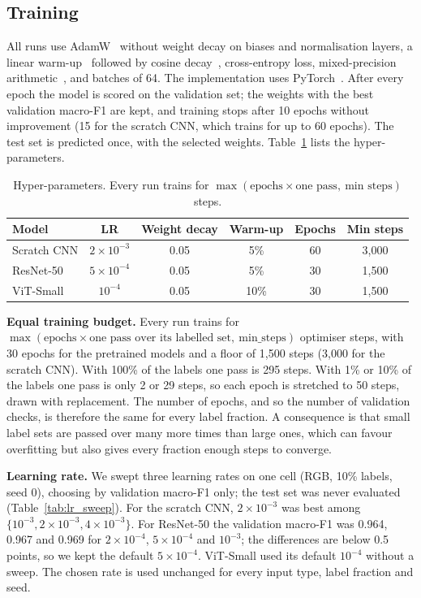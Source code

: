 \documentclass[conference]{IEEEtran}
\begin{document}
\subsection{Training}
All runs use AdamW~\cite{loshchilov2019adamw} without weight decay on biases and normalisation layers, a linear warm-up~\cite{goyal2017warmup} followed by cosine decay~\cite{loshchilov2017sgdr}, cross-entropy loss, mixed-precision arithmetic~\cite{micikevicius2018mixed}, and batches of 64. The implementation uses PyTorch~\cite{paszke2019pytorch}. After every epoch the model is scored on the validation set; the weights with the best validation macro-F1 are kept, and training stops after 10 epochs without improvement (15 for the scratch CNN, which trains for up to 60 epochs). The test set is predicted once, with the selected weights. Table~\ref{tab:hparams} lists the hyper-parameters.

\begin{table}[t]
\centering
\caption{Hyper-parameters. Every run trains for $\max(\text{epochs}\times\text{one pass},\ \text{min steps})$ steps.}
\label{tab:hparams}
\small
\begin{tabular}{lccccc}
\toprule
Model & LR & Weight decay & Warm-up & Epochs & Min steps \\
\midrule
Scratch CNN & $2\times10^{-3}$ & 0.05 & 5\% & 60 & 3{,}000 \\
ResNet-50 & $5\times10^{-4}$ & 0.05 & 5\% & 30 & 1{,}500 \\
ViT-Small & $10^{-4}$ & 0.05 & 10\% & 30 & 1{,}500 \\
\bottomrule
\end{tabular}
\end{table}

\textbf{Equal training budget.} Every run trains for $\max(\text{epochs}\times\text{one pass over its labelled set},\ \text{min\_steps})$ optimiser steps, with 30 epochs for the pretrained models and a floor of 1{,}500 steps (3{,}000 for the scratch CNN). With 100\% of the labels one pass is 295 steps. With 1\% or 10\% of the labels one pass is only 2 or 29 steps, so each epoch is stretched to 50 steps, drawn with replacement. The number of epochs, and so the number of validation checks, is therefore the same for every label fraction. A consequence is that small label sets are passed over many more times than large ones, which can favour overfitting but also gives every fraction enough steps to converge.

\textbf{Learning rate.} We swept three learning rates on one cell (RGB, 10\% labels, seed 0), choosing by validation macro-F1 only; the test set was never evaluated (Table~\ref{tab:lr_sweep}). For the scratch CNN, $2\times10^{-3}$ was best among $\{10^{-3}, 2\times10^{-3}, 4\times10^{-3}\}$. For ResNet-50 the validation macro-F1 was 0.964, 0.967 and 0.969 for $2\times10^{-4}$, $5\times10^{-4}$ and $10^{-3}$; the differences are below 0.5 points, so we kept the default $5\times10^{-4}$. ViT-Small used its default $10^{-4}$ without a sweep. The chosen rate is used unchanged for every input type, label fraction and seed.
\end{document}
